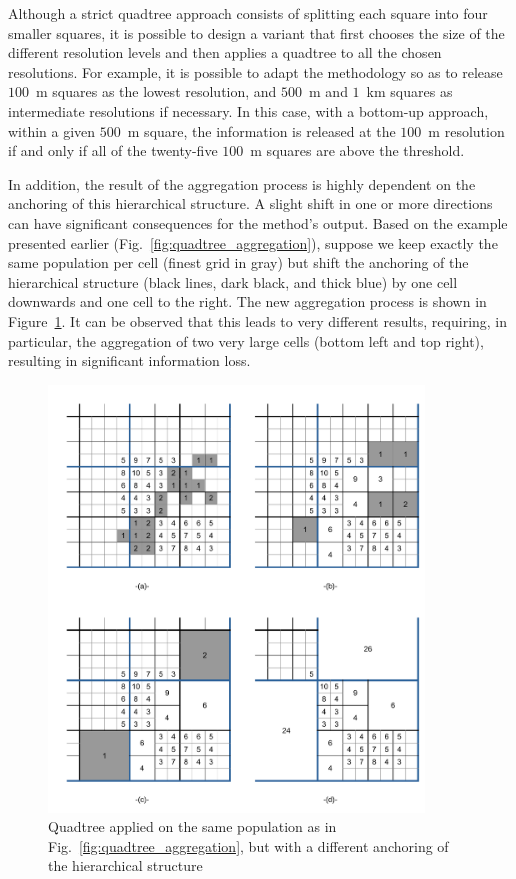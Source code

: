 Although a strict quadtree approach consists of splitting each square into four smaller squares, it is possible to design a variant that first chooses the size of the different resolution levels and then applies a quadtree to all the chosen resolutions. For example, it is possible to adapt the methodology so as to release $100$~m squares as the lowest resolution, and $500$~m and $1$~km squares as intermediate resolutions if necessary. In this case, with a bottom-up approach, within a given $500$~m square, the information is released at the $100$~m resolution if and only if all of the twenty-five $100$~m squares are above the threshold.\bigskip

In addition, the result of the aggregation process is highly dependent on the anchoring of this hierarchical structure. A slight shift in one or more directions can have significant consequences for the method's output. Based on the example presented earlier (Fig.~\ref{fig:quadtree_aggregation}), suppose we keep exactly the same population per cell (finest grid in gray) but shift the anchoring of the hierarchical structure (black lines, dark black, and thick blue) by one cell downwards and one cell to the right. The new aggregation process is shown in Figure~\ref{fig:quadtree_pos_grid}. It can be observed that this leads to very different results, requiring, in particular, the aggregation of two very large cells (bottom left and top right), resulting in significant information loss.

\begin{figure}[ht]
    \centering
    \includegraphics[width=0.89\textwidth]{figures/Quadtree/adaptation_example_variante_pos_grid.pdf}
    \caption{Quadtree applied on the same population as in Fig.~\ref{fig:quadtree_aggregation}, but with a different anchoring of the hierarchical structure}
    \label{fig:quadtree_pos_grid}
\end{figure}

